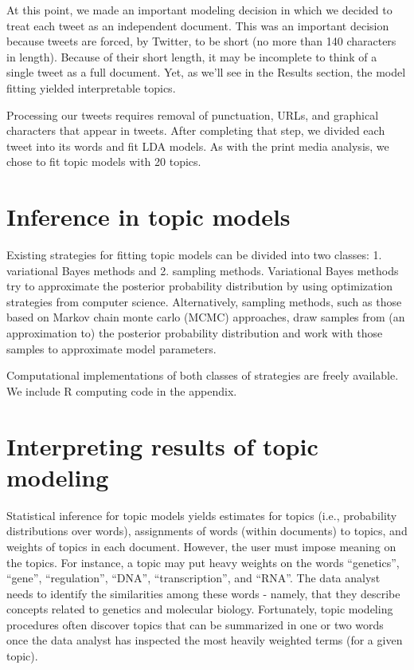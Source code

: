 \documentclass[12pt,]{article}
\begin{document}
At this point, we made an important modeling decision in which we
decided to treat each tweet as an independent document. This was an
important decision because tweets are forced, by Twitter, to be short
(no more than 140 characters in length). Because of their short length,
it may be incomplete to think of a single tweet as a full document. Yet,
as we'll see in the Results section, the model fitting yielded
interpretable topics.

Processing our tweets requires removal of punctuation, URLs, and
graphical characters that appear in tweets. After completing that step,
we divided each tweet into its words and fit LDA models. As with the
print media analysis, we chose to fit topic models with 20 topics.

\section{Inference in topic models}\label{inference-in-topic-models}

Existing strategies for fitting topic models can be divided into two
classes: 1. variational Bayes methods and 2. sampling methods.
Variational Bayes methods try to approximate the posterior probability
distribution by using optimization strategies from computer science.
Alternatively, sampling methods, such as those based on Markov chain
monte carlo (MCMC) approaches, draw samples from (an approximation to)
the posterior probability distribution and work with those samples to
approximate model parameters.

Computational implementations of both classes of strategies are freely
available. We include R computing code in the appendix.

\section{Interpreting results of topic
modeling}\label{interpreting-results-of-topic-modeling}

Statistical inference for topic models yields estimates for topics
(i.e., probability distributions over words), assignments of words
(within documents) to topics, and weights of topics in each document.
However, the user must impose meaning on the topics. For instance, a
topic may put heavy weights on the words ``genetics'', ``gene'',
``regulation'', ``DNA'', ``transcription'', and ``RNA''. The data
analyst needs to identify the similarities among these words - namely,
that they describe concepts related to genetics and molecular biology.
Fortunately, topic modeling procedures often discover topics that can be
summarized in one or two words once the data analyst has inspected the
most heavily weighted terms (for a given topic).
\end{document}

